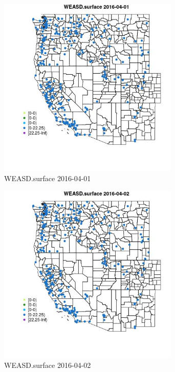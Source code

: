 \begin{figure} 
\centering  
\includegraphics[width=0.77\textwidth]{Code_Outputs/Report_ML_input_PM25_Step4_part_e_de_duplicated_aveswNAs_MapObsWEASDsurface2016-04-01.jpg} 
\caption{\label{fig:Report_ML_input_PM25_Step4_part_e_de_duplicated_aveswNAsMapObsWEASDsurface2016-04-01}WEASD.surface 2016-04-01} 
\end{figure} 
 

\begin{figure} 
\centering  
\includegraphics[width=0.77\textwidth]{Code_Outputs/Report_ML_input_PM25_Step4_part_e_de_duplicated_aveswNAs_MapObsWEASDsurface2016-04-02.jpg} 
\caption{\label{fig:Report_ML_input_PM25_Step4_part_e_de_duplicated_aveswNAsMapObsWEASDsurface2016-04-02}WEASD.surface 2016-04-02} 
\end{figure} 
 

